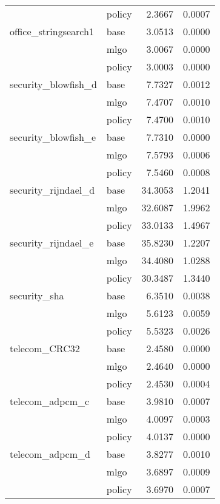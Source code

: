 \begin{table*}
\begin{tabular}[t]{llrr}
                & policy &        2.3667 &    0.0007 \\
office\_stringsearch1 & base &        3.0513 &    0.0000 \\
                & mlgo &        3.0067 &    0.0000 \\
                & policy &        3.0003 &    0.0000 \\
security\_blowfish\_d & base &        7.7327 &    0.0012 \\
                & mlgo &        7.4707 &    0.0010 \\
                & policy &        7.4700 &    0.0010 \\
security\_blowfish\_e & base &        7.7310 &    0.0000 \\
                & mlgo &        7.5793 &    0.0006 \\
                & policy &        7.5460 &    0.0008 \\
security\_rijndael\_d & base &       34.3053 &    1.2041 \\
                & mlgo &       32.6087 &    1.9962 \\
                & policy &       33.0133 &    1.4967 \\
security\_rijndael\_e & base &       35.8230 &    1.2207 \\
                & mlgo &       34.4080 &    1.0288 \\
                & policy &       30.3487 &    1.3440 \\
security\_sha & base &        6.3510 &    0.0038 \\
                & mlgo &        5.6123 &    0.0059 \\
                & policy &        5.5323 &    0.0026 \\
telecom\_CRC32 & base &        2.4580 &    0.0000 \\
                & mlgo &        2.4640 &    0.0000 \\
                & policy &        2.4530 &    0.0004 \\
telecom\_adpcm\_c & base &        3.9810 &    0.0007 \\
                & mlgo &        4.0097 &    0.0003 \\
                & policy &        4.0137 &    0.0000 \\
telecom\_adpcm\_d & base &        3.8277 &    0.0010 \\
                & mlgo &        3.6897 &    0.0009 \\
                & policy &        3.6970 &    0.0007 \\
\bottomrule
\end{tabular}
\end{table*}

